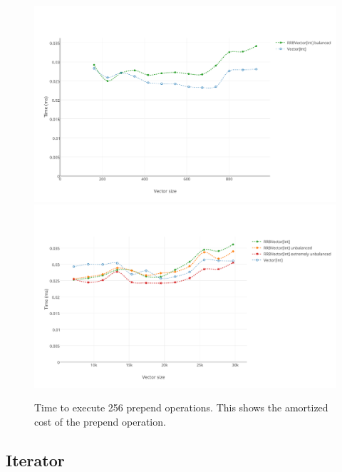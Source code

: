 \begin{figure}[h!]
  \centering
  \includegraphics[width=\textwidth]{Benchmarks/Prepend_2.pdf}
  \includegraphics[width=\textwidth]{Benchmarks/Prepend_3.pdf}
  \label{PrependBenchmarks}
  \caption{Time to execute 256 prepend operations. This shows the amortized cost of the prepend operation.}
\end{figure}

\subsection{Iterator}

